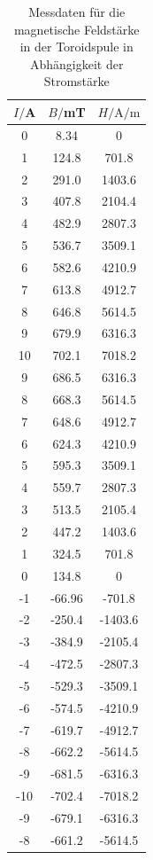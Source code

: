\documentclass[
  bibliography=totoc,     %
  captions=tableheading,  %
  titlepage=firstiscover, %
]{scrartcl}
\begin{document}
  \begin{table}
    \centering
    \caption{Messdaten für die magnetische Feldstärke 
            in der Toroidspule in Abhängigkeit der Stromstärke}
    \label{tab:hysterese}
    \begin{tabular}{c c c}
      \toprule
      $I/$A & $B/$mT & $H/\unit{\ampere}/\unit{\m}$\\
      \midrule
      0 & 8.34 & 0\\
      1 & 124.8 & 701.8\\
      2 & 291.0 & 1403.6\\
      3 & 407.8 & 2104.4\\
      4 & 482.9 & 2807.3\\
      5 & 536.7 & 3509.1\\
      6 & 582.6 & 4210.9\\
      7 & 613.8 & 4912.7\\
      8 & 646.8 & 5614.5\\
      9 & 679.9 & 6316.3\\
      10 & 702.1 & 7018.2\\
      9 & 686.5 & 6316.3\\
      8 & 668.3 & 5614.5\\
      7 & 648.6 & 4912.7\\
      6 & 624.3 & 4210.9\\
      5 & 595.3 & 3509.1\\
      4 & 559.7 & 2807.3\\
      3 & 513.5 & 2105.4\\
      2 & 447.2 & 1403.6\\
      1 & 324.5 & 701.8\\
      0 & 134.8 & 0\\
      -1 & -66.96 & -701.8\\
      -2 & -250.4 & -1403.6\\
      -3 & -384.9 & -2105.4\\
      -4 & -472.5 & -2807.3\\
      -5 & -529.3 & -3509.1\\
      -6 & -574.5 & -4210.9\\
      -7 & -619.7 & -4912.7\\
      -8 & -662.2 & -5614.5\\
      -9 & -681.5 & -6316.3\\
      -10 & -702.4 & -7018.2 \\
      -9 & -679.1 & -6316.3\\
      -8 & -661.2 & -5614.5\\

\end{tabular}
\end{table}
\end{document}
